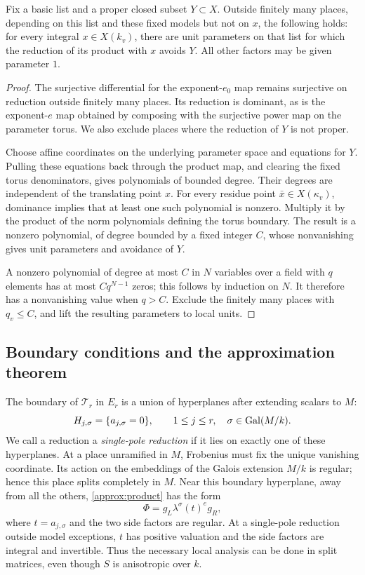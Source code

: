 \begin{lemma}
\label{approx:residue-list}
Fix a basic list and a proper closed subset $Y\subset X$.
Outside finitely many places, depending on this list and these
fixed models but not on $x$, the following holds: for every
integral $x\in X(k_v)$, there are unit parameters on that list
for which the reduction of its product with $x$ avoids $Y$.
All other factors may be given parameter $1$.
\end{lemma}

\begin{proof}
The surjective differential for the exponent-$e_0$ map remains
surjective on reduction outside finitely many places.  Its
reduction is dominant, as is the exponent-$e$ map obtained by
composing with the surjective power map on the parameter torus.
We also exclude places where the reduction of $Y$ is not proper.

Choose affine coordinates on the underlying parameter space
and equations for $Y$.  Pulling these equations back through
the product map, and clearing the fixed torus denominators,
gives polynomials of bounded degree.  Their degrees are
independent of the translating point $x$.  For every residue
point $\bar x\in X(\kappa_v)$, dominance implies that at least
one such polynomial is nonzero.  Multiply it by the product
of the norm polynomials defining the torus boundary.  The
result is a nonzero polynomial, of degree bounded by a fixed
integer $C$, whose nonvanishing gives unit parameters and
avoidance of $Y$.

A nonzero polynomial of degree at most $C$ in $N$ variables
over a field with $q$ elements has at most $Cq^{N-1}$ zeros;
this follows by induction on $N$.  It therefore has a
nonvanishing value when $q>C$.  Exclude the finitely many
places with $q_v\leq C$, and lift the resulting parameters
to local units.
\end{proof}

\subsection{Boundary conditions and the approximation theorem}

The boundary of $\mathcal T_r$ in $E_r$ is a union of
hyperplanes after extending scalars to $M$:
\[
 H_{j,\sigma}=\{a_{j,\sigma}=0\},
 \qquad 1\leq j\leq r,\quad \sigma\in\operatorname{Gal}(M/k).
\]
We call a reduction a \emph{single-pole reduction} if it lies
on exactly one of these hyperplanes.  At a place unramified
in $M$, Frobenius must fix the unique vanishing coordinate.
Its action on the embeddings of the Galois extension $M/k$
is regular; hence this place splits completely in $M$.
Near this boundary hyperplane, away from all the others,
\eqref{approx:product} has the form
\begin{equation}\label{approx:single-pole}
                 \Phi=g_L\lambda^\sigma(t)^e g_R,
\end{equation}
where $t=a_{j,\sigma}$ and the two side factors are regular.
At a single-pole reduction outside model exceptions, $t$ has
positive valuation and the side factors are integral and
invertible.  Thus the necessary local analysis can be done
in split matrices, even though $S$ is anisotropic over $k$.

